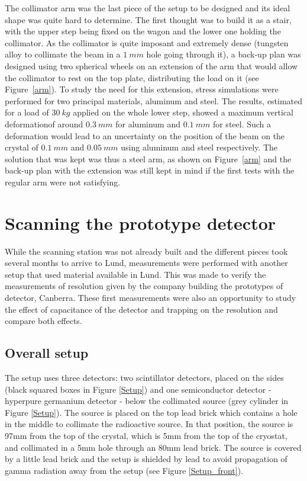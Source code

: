 \documentclass[11pt,a4paper]{article}
\begin{document}
The collimator arm was the last piece of the setup to be designed and its ideal shape was quite hard to determine. The first thought was to build it as a stair, with the upper step being fixed on the wagon and the lower one holding the collimator. As the collimator is quite imposant and extremely dense (tungsten alloy to collimate the beam in a $1~mm$ hole going through it), a back-up plan was designed using two spherical wheels on an extension of the arm that would allow the collimator to rest on the top plate, distributing the load on it (see Figure~\ref{arm}). To study the need for this extension, stress simulations were performed for two principal materials, aluminum and steel. The results, estimated for a load of $30~kg$ applied on the whole lower step, showed a maximum vertical deformationof around $0.3~mm$ for aluminum and $0.1~mm$ for steel. Such a deformation would lead to an uncertainty on the position of the beam on the crystal of $0.1~mm$ and $0.05~mm$ using aluminum and steel respectively. The solution that was kept was thus a steel arm, as shown on Figure~\ref{arm} and the back-up plan with the extension was still kept in mind if the first tests with the regular arm were not satisfying.

\newpage

\section{Scanning the prototype detector}

While the scanning station was not already built and the different pieces took several months to arrive to Lund, measurements were performed with another setup that used material available in Lund. This was made to verify the measurements of resolution given by the company building the prototypes of detector, Canberra. These first measurements were also an opportunity to study the effect of capacitance of the detector and trapping on the resolution and compare both effects.

\subsection{Overall setup} \label{setup}

The setup uses three detectors: two scintillator detectors, placed on the sides (black squared boxes in Figure \ref{Setup}) and one semiconductor detector - hyperpure germanium detector - below the collimated source (grey cylinder in Figure \ref{Setup}). The source is placed on the top lead brick which contains a hole in the middle to collimate the radioactive source. In that position, the source is 97mm from the top of the crystal, which is 5mm from the top of the cryostat, and collimated in a 5mm hole through an 80mm lead brick. The source is covered by a little lead brick and the setup is shielded by lead to avoid propagation of gamma radiation away from the setup (see Figure \ref{Setup_front}).
\end{document}
